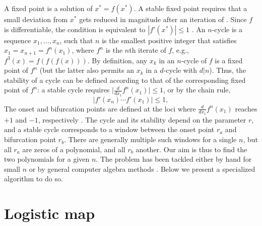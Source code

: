 \documentclass{ws-ijbc}
\begin{document}
A fixed point is a solution of $x^* = f(x^*)$.
%
A stable fixed point requires that a small deviation from $x^*$
  gets reduced in magnitude after an iteration of .
%
Since $f$ is differentiable,
  the condition is equivalent to $|f'(x^*)| \le 1$
  \cite{strogatz, hao}.
%
An $n$-cycle is a sequence $x_1, \dots, x_n$,
  such that $n$ is the smallest positive integer
  that satisfies $x_1 = x_{n+1} = f^n(x_1)$,
  where $f^n$ is the $n$th iterate of $f$,
  e.g., $f^3(x) = f(f(f(x)))$.
By definition, any $x_k$ in an $n$-cycle of $f$ is a fixed point of $f^n$
(but the latter also permits an $x_k$ in a $d$-cycle with $d|n$).
%
%
%
Thus, the stability of a cycle can be defined
  according to that of the corresponding fixed point of $f^n$:
  a stable cycle requires
  $\big| \frac {d} {dx_1} f^n(x_1) \big| \le 1$,
  or by the chain rule,
%
%
%
\begin{equation}
  \Big| f'(x_n) \cdots f'(x_1) \Big| \le 1,
\label{eq:der}
\end{equation}
%
%
The onset and bifurcation points
  are defined at the loci
  where $\frac {d} {dx_1} f^n(x_1)$ reaches $+1$ and $-1$,
  respectively \cite{strogatz, hao}.
%
%
%
The cycle and its stability depend on the parameter $r$,
%
and a stable cycle corresponds to a window
  between the onset point $r_a$ and bifurcation point $r_b$.
%
There are generally multiple such windows for a single $n$,
  but all $r_a$ are zeros of a polynomial,
  and all $r_b$ another.
%
Our aim is thus to find the two polynomials for a given $n$.
%
The problem has been tackled either by hand for small $n$
\cite{brown1, brown2, stephenson1, stephenson2, stephenson3,
      saha, bechhoefer, gordon, burm, zhang}
or by general computer algebra methods \cite{bailey1, bailey2, kk1, lewis}.
%
Below we present a specialized algorithm to do so.
%
%
%
%







\section{\label{sec:logmap}Logistic map}
\end{document}
